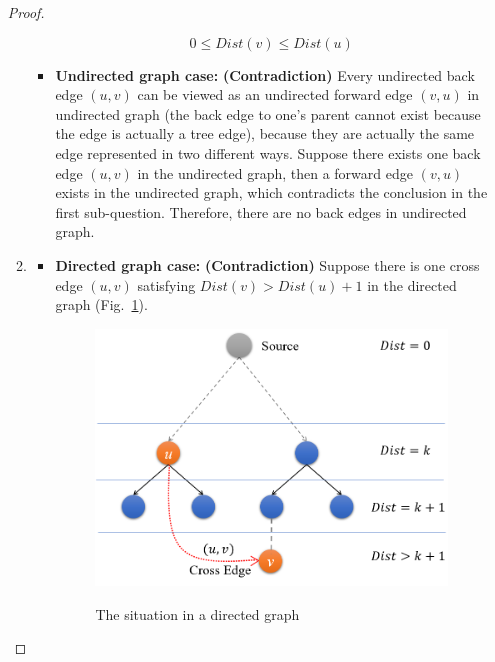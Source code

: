 \documentclass[12pt,a4paper]{article}
\theoremstyle{definition}
\begin{document}
\begin{enumerate}
\begin{proof}
\begin{enumerate}
\begin{itemize}
        \begin{displaymath}
        0 \leq Dist(v) \leq Dist(u)
        \end{displaymath}
        \item \textbf{\color{purple} Undirected graph case: }
        \textbf{(Contradiction)} Every undirected back edge $(u, v)$ can be viewed as an undirected forward edge $(v, u)$ in undirected graph (the back edge to one's parent cannot exist because the edge is actually a tree edge), because they are actually the same edge represented in two different ways. Suppose there exists one back edge $(u, v)$ in the undirected graph, then a forward edge $(v, u)$ exists in the undirected graph, which contradicts the conclusion in the first sub-question. Therefore, there are no back edges in undirected graph.
        \end{itemize}
        \clearpage
    \item \begin{itemize}
    \item \textbf{\color{purple} Directed graph case: } \textbf{(Contradiction)} Suppose there is one cross edge $(u, v)$ satisfying $Dist(v) > Dist(u) + 1$ in the directed graph (Fig.~\ref{fig1-1}).
        \begin{figure}[h]
          \centering
          \includegraphics[width=4.5in]{figures/prob1-3.png}\\
          \caption{The situation in a directed graph}\label{fig1-1}
        \end{figure}


\end{itemize}
\end{enumerate}
\end{proof}
\end{enumerate}
\end{document}
